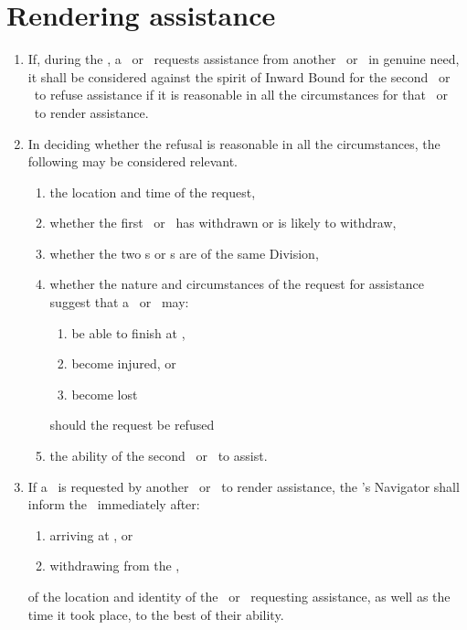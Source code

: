 \documentclass[12pt]{report}
\begin{document}
  \section{Rendering assistance}
  \begin{enumerate}
    \item If, during the \race, a \competitor\ or \team\ requests assistance from another \competitor\ or \team\ in genuine need, it shall be considered against the spirit of Inward Bound for the second \competitor\ or \team\ to refuse assistance if it is reasonable in all the circumstances for that \competitor\ or \team\ to render assistance.
    \item In deciding whether the refusal is reasonable in all the circumstances, the following may be considered relevant.
    \begin{enumerate}
        \item the location and time of the request,
      \item whether the first \competitor\ or \team\ has withdrawn or is likely to withdraw,
      \item whether the two \competitor s  or \team s are of the same Division,
      \item whether the nature and circumstances of the request for assistance suggest that a \competitor\ or \team\ may:
      \begin{enumerate}
        \item be able to finish at \Endpoint,
        \item become injured, or
        \item become lost
      \end{enumerate}
      should the request be refused
      \item the ability of the second \competitor\ or \team\ to assist.
    \end{enumerate}
    \item If a \team\ is requested by another \competitor\ or \team\ to render assistance, the \team's Navigator shall inform the \RaceDirector\ immediately after:
    \begin{enumerate}
      \item arriving at \Endpoint, or
      \item withdrawing from the \race,
    \end{enumerate}
    of the location and identity of the \competitor\ or \team\ requesting assistance, as well as the time it took place, to the best of their ability.
  \end{enumerate}
\end{document}
